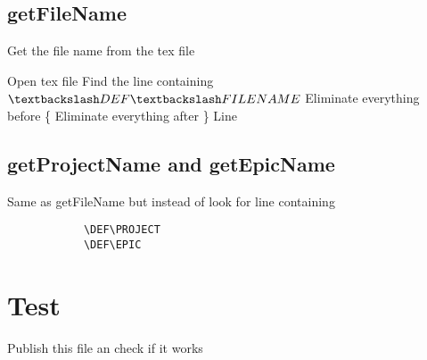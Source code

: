     \break

    \subsection{getFileName}
        \begin{algorithm}[h!]
            \caption{Get the file name from the tex file}
        \begin{algorithmic}
            \State Open tex file
            \State Find the line containing $\textbackslash DEF \textbackslash FILENAME$
            \State Eliminate everything before \{
            \State Eliminate everything after \}
            \State \Return Line
            \EndFunction
        \end{algorithmic}
        \end{algorithm}

    \subsection{getProjectName and getEpicName}
        Same as getFileName but instead of look for line containing
        \begin{verbatim}
            \DEF\PROJECT
            \DEF\EPIC
        \end{verbatim}

    \section{Test}
    Publish this file an check if it works
